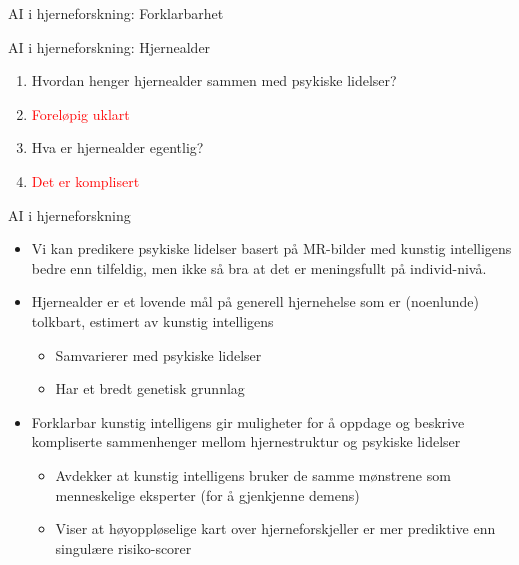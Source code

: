 \documentclass[8pt]{beamer}
\begin{document}
\begin{frame}{AI i hjerneforskning: Forklarbarhet}
{
		}
	\end{frame}

	\begin{frame}{AI i hjerneforskning: Hjernealder}
		\begin{enumerate}
			\item Hvordan henger hjernealder sammen med psykiske lidelser?
			\item[ ] \textcolor{red}{Foreløpig uklart}
			\item Hva er hjernealder egentlig?
			\item[ ] \textcolor{red}{Det er komplisert}
		\end{enumerate}
	\end{frame}

	\begin{frame}{AI i hjerneforskning}
		\begin{itemize}
			\item Vi kan predikere psykiske lidelser basert på MR-bilder med kunstig intelligens bedre enn tilfeldig, men ikke så bra at det er meningsfullt på individ-nivå.
			\item Hjernealder er et lovende mål på generell hjernehelse som er (noenlunde) tolkbart, estimert av kunstig intelligens
			\begin{itemize}
				\item Samvarierer med psykiske lidelser
				\item Har et bredt genetisk grunnlag
			\end{itemize}
			\item Forklarbar kunstig intelligens gir muligheter for å oppdage og beskrive kompliserte sammenhenger mellom hjernestruktur og psykiske lidelser
			\begin{itemize}
				\item Avdekker at kunstig intelligens bruker de samme mønstrene som menneskelige eksperter (for å gjenkjenne demens)
				\item Viser at høyoppløselige kart over hjerneforskjeller er mer prediktive enn singulære risiko-scorer
			\end{itemize}
		\end{itemize}
	\end{frame}
\end{document}
